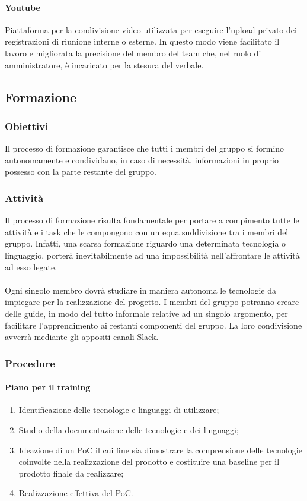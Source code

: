 	\paragraph{Youtube}
	Piattaforma per la condivisione video utilizzata per eseguire l'upload privato dei registrazioni di riunione interne o esterne. In questo modo viene facilitato il lavoro e migliorata la precisione del membro del team che, nel ruolo di amministratore, è incaricato per la stesura del verbale.


   	\subsection{Formazione}
	\subsubsection{Obiettivi}
	Il processo di formazione garantisce che tutti i membri del gruppo si formino autonomamente e condividano, in caso di necessità, informazioni in proprio possesso con la parte restante del gruppo. 
	
	\subsubsection{Attività}
	Il processo di formazione risulta fondamentale per portare a compimento tutte le attività e i task che le compongono con un equa suddivisione tra i membri del gruppo. Infatti, una scarsa formazione riguardo una determinata tecnologia o linguaggio, porterà inevitabilmente ad una impossibilità nell'affrontare le attività ad esso legate.\\\\
	Ogni singolo membro dovrà studiare in maniera autonoma le tecnologie da impiegare per la realizzazione del progetto. I membri del gruppo potranno creare delle guide, in modo del tutto informale relative ad un singolo argomento, per facilitare l'apprendimento ai restanti componenti del gruppo. La loro condivisione avverrà mediante gli appositi canali Slack.
	
	\subsubsection{Procedure}
	\paragraph{Piano per il training}
	\begin{enumerate}
		\item Identificazione delle tecnologie e linguaggi di utilizzare;
		\item Studio della documentazione delle tecnologie e dei linguaggi;
		\item Ideazione di un PoC il cui fine sia dimostrare la comprensione delle tecnologie coinvolte nella realizzazione del prodotto e costituire una baseline per il prodotto finale da realizzare;
		\item Realizzazione effettiva del PoC.   		
	\end{enumerate}
	
